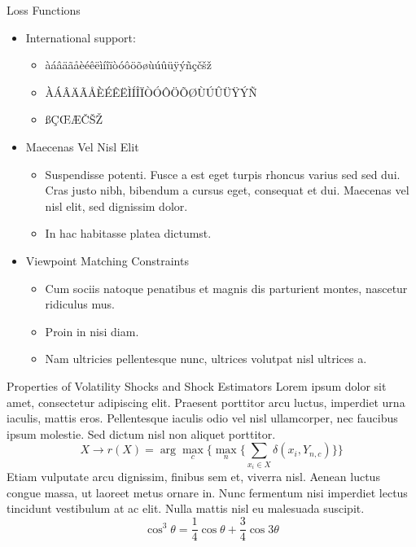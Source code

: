 \documentclass{beamer} %
\begin{document}
\begin{frame}[t]
\begin{columns}[t]
\begin{column}{0.465\textwidth}
\begin{block}{Loss Functions}	
	\begin{itemize}
		\item International support:
		\begin{itemize}
			\item àáâäãåèéêëìíîïòóôöõøùúûüÿýñçčšž
			\item ÀÁÂÄÃÅÈÉÊËÌÍÎÏÒÓÔÖÕØÙÚÛÜŸÝÑ
			\item ßÇŒÆČŠŽ
		\end{itemize}
		\item Maecenas Vel Nisl Elit
		\begin{itemize}
			\item Suspendisse potenti. Fusce a est eget turpis rhoncus varius sed sed dui. Cras justo nibh, bibendum a cursus eget, consequat et dui. Maecenas vel nisl elit, sed dignissim dolor. 
			\item In hac habitasse platea dictumst.
		\end{itemize}
		
		\item Viewpoint Matching Constraints
		\begin{itemize}
			\item Cum sociis natoque penatibus et magnis dis parturient montes, nascetur ridiculus mus. 
			\item Proin in nisi diam.
			\item Nam ultricies pellentesque nunc, ultrices volutpat nisl ultrices a.
		\end{itemize}
	\end{itemize}
\end{block}


\begin{block}{Properties of Volatility Shocks and Shock Estimators}
	Lorem ipsum dolor sit amet, consectetur adipiscing elit. Praesent porttitor arcu luctus, imperdiet urna iaculis, mattis eros. Pellentesque iaculis odio vel nisl ullamcorper, nec faucibus ipsum molestie. Sed dictum nisl non aliquet porttitor.
	\begin{equation}
		X \rightarrow r(X) = \arg \max_{c} \Big\{ \max_n \big\{ \sum_{x_i \in X} \delta(x_i,Y_{n,c})\big\} \Big\} 
	\end{equation}
	Etiam vulputate arcu dignissim, finibus sem et, viverra nisl. Aenean luctus congue massa, ut laoreet metus ornare in. Nunc fermentum nisi imperdiet lectus tincidunt vestibulum at ac elit. Nulla mattis nisl eu malesuada suscipit.
	\begin{equation}
		\cos^3 \theta =\frac{1}{4}\cos\theta+\frac{3}{4}\cos 3\theta
	\end{equation}
\end{block}


\end{column}
\end{columns}
\end{frame}
\end{document}
